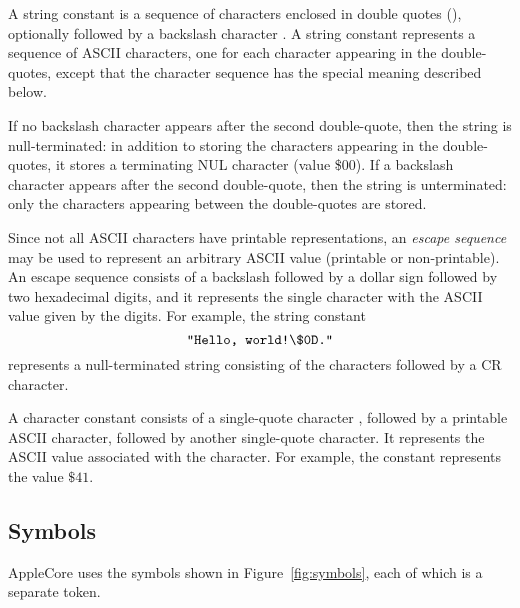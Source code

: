 \documentclass[10pt]{article}
\begin{document}
 A string constant is a sequence of
characters enclosed in double quotes (), optionally
followed by a backslash character \kwd{$\backslash$}.  A string
constant represents a sequence of ASCII characters, one for each
character appearing in the double-quotes, except that the character
sequence \kwd{\bs\$} has the special meaning described below.

If no backslash character appears after the second double-quote, then
the string is null-terminated:  in addition to storing the characters
appearing in the double-quotes, it stores a terminating NUL character
(value \$00).  If a backslash character appears after the second
double-quote, then the string is unterminated:  only the characters
appearing between the double-quotes are stored.

Since not all ASCII characters have printable representations, an
\emph{escape sequence} may be used to represent an arbitrary ASCII
value (printable or non-printable).  An escape sequence consists of a
backslash \kwd{\bs} followed by a dollar sign \kwd{\$} followed by two
hexadecimal digits, and it represents the single character with the
ASCII value given by the digits.  For example, the string constant
%
$$\texttt{"Hello, world!\textbackslash\$0D."}$$
%
represents a null-terminated string consisting of the characters
 followed by a CR character.

 A character constant consists of a
single-quote character , followed by a printable ASCII
character, followed by another single-quote character.  It represents
the ASCII value associated with the character.  For example, the
constant  represents the value $\$41$.

\subsection{Symbols}

AppleCore uses the symbols shown in Figure~\ref{fig:symbols}, each of
which is a separate token.
\end{document}
